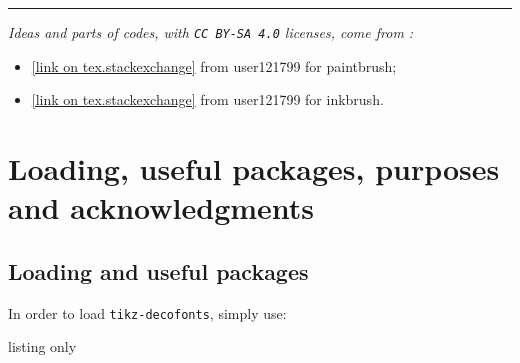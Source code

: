 \documentclass[11pt,a4paper]{ltxdoc}
\begin{document}
\begin{tcolorbox}[colframe=lightgray,colback=lightgray!5]
\hfill{}
\end{tcolorbox}

\begin{tcolorbox}[colframe=lightgray,colback=lightgray!5]
\hfill{}~~\hfill~
\end{tcolorbox}

\vfill~

\hrule

\vspace*{5mm}

\textit{Ideas and parts of codes, with \texttt{CC\,BY-SA\,4.0} licenses, come from :}

\begin{itemize}
	\item \href{https://tex.stackexchange.com/questions/475141/simulating-paintbrush-strokes-in-tikz}{[link on tex.stackexchange]} from \textsf{user121799} for paintbrush;
	\item \href{https://tex.stackexchange.com/questions/460836/custom-line-cap-to-simulate-inked-line-in-tikz/460842#460842}{[link on tex.stackexchange]} from \textsf{user121799} for inkbrush.
\end{itemize}

\pagebreak


\hypertarget{matoc}{}

\tableofcontents

\vspace*{5mm}


\pagebreak

\section{Loading, useful packages, purposes and acknowledgments}

\subsection{Loading and useful packages}

In order to load \texttt{tikz-decofonts}, simply use:

\begin{DemoCode}{listing only}
\usepackage{tikz-decofonts}
\end{DemoCode}
\end{document}
